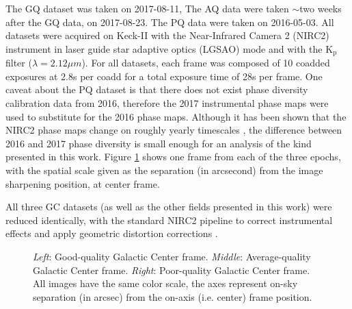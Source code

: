 \documentclass[]{spie}  %
\begin{document}
The GQ dataset was taken on 2017-08-11, The AQ data were taken $\sim$two weeks after the GQ data, on 2017-08-23. The PQ data were taken on 2016-05-03. All datasets were acquired on Keck-II with the Near-Infrared Camera 2 (NIRC2) instrument in laser guide star adaptive optics (LGSAO) mode and with the K$_\textrm{p}$ filter ($\lambda = 2.12 \mu m$). For all datasets, each frame was composed of 10 coadded exposures at 2.8s per coadd for a total exposure time of 28s per frame. One caveat about the PQ dataset is that there does not exist phase diversity calibration data from 2016, therefore the 2017 instrumental phase maps were used to substitute for the 2016 phase maps. Although it has been shown that the NIRC2 phase maps change on roughly yearly timescales \citep{Ciurlo:inprep}, the difference between 2016 and 2017 phase diversity is small enough for an analysis of the kind presented in this work. Figure \ref{fig:gc_images} shows one frame from each of the three epochs, with the spatial scale given as the separation (in arcsecond) from the image sharpening position, at center frame.

All three GC datasets (as well as the other fields presented in this work) were reduced identically, with the standard NIRC2 pipeline to correct instrumental effects \citep{ghez:2008a, lu:2008a} and apply geometric distortion corrections \cite{lu:2008a, service:2016a}.

\begin{figure}[!htb]
 \caption{\footnotesize \textit{Left}: Good-quality Galactic Center frame. \textit{Middle}: Average-quality Galactic Center frame. \textit{Right}: Poor-quality Galactic Center frame. All images have the same color scale, the axes represent on-sky separation (in arcsec) from the on-axis (i.e. center) frame position. \label{fig:gc_images}}
\end{figure}

\end{document}
